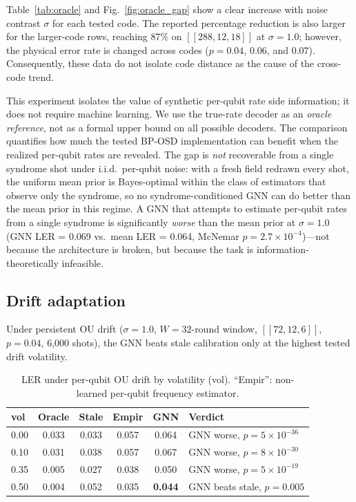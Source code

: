 \documentclass[a4paper,twocolumn,11pt,nopdfoutputerror]{quantumarticle}
\newcommand{\code}[3]{\ensuremath{[\![#1,#2,#3]\!]}}
\begin{document}
Table~\ref{tab:oracle} and Fig.~\ref{fig:oracle_gap} show a clear
increase with noise contrast $\sigma$ for each tested code. The reported
percentage reduction is also larger for the larger-code rows, reaching
$87\%$ on $\code{288}{12}{18}$ at $\sigma=1.0$; however, the physical
error rate is changed across codes ($p=0.04$, $0.06$, and $0.07$).
Consequently, these data do not isolate code distance as the cause of
the cross-code trend.

This experiment isolates the value of synthetic per-qubit rate side
information; it does not require machine learning. We use the true-rate
decoder as an \emph{oracle reference}, not as a formal upper bound on all
possible decoders. The comparison quantifies how much the tested BP-OSD
implementation can benefit when the realized per-qubit rates are
revealed. The gap is \emph{not}
recoverable from a single syndrome shot under i.i.d.\ per-qubit
noise: with a fresh field redrawn every shot, the uniform mean
prior is Bayes-optimal within the class of estimators that observe
only the syndrome, so no syndrome-conditioned GNN can do better
than the mean prior in this regime. A GNN that attempts to estimate
per-qubit rates from a single syndrome is significantly
\emph{worse} than the mean prior at $\sigma=1.0$ (GNN LER = 0.069
vs.\ mean LER = 0.064, McNemar $p = 2.7\times10^{-4}$)---not
because the architecture is broken, but because the task is
information-theoretically infeasible.

\subsection{Drift adaptation}\label{sec:drift}

Under persistent OU drift ($\sigma=1.0$, $W=32$-round window,
$\code{72}{12}{6}$, $p=0.04$, 6{,}000 shots), the GNN beats
stale calibration only at the highest tested drift volatility.

\begin{table}[t]
\centering
\caption{LER under per-qubit OU drift by volatility (vol).
         ``Empir'': non-learned per-qubit frequency estimator.}
\label{tab:drift}
\begin{tabular}{@{}lccccl@{}}
\toprule
vol & Oracle & Stale & Empir & GNN & Verdict \\
\midrule
0.00 & 0.033 & 0.033 & 0.057 & 0.064 & GNN worse, $p=5\!\times\!10^{-36}$ \\
0.10 & 0.031 & 0.038 & 0.057 & 0.067 & GNN worse, $p=8\!\times\!10^{-30}$ \\
0.35 & 0.005 & 0.027 & 0.038 & 0.050 & GNN worse, $p=5\!\times\!10^{-19}$ \\
0.50 & 0.004 & 0.052 & 0.035 & \textbf{0.044} & GNN beats stale, $p=0.005$ \\
\bottomrule
\end{tabular}
\end{table}
\end{document}
